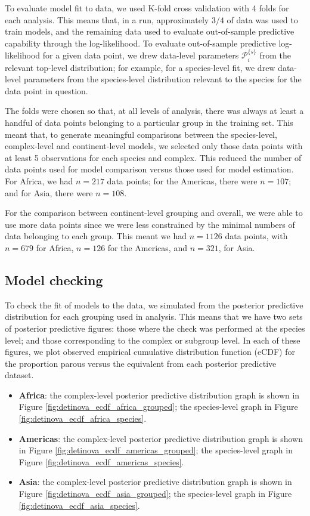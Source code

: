 \documentclass[12pt]{article}
\begin{document}
{To evaluate model fit to data, we used K-fold cross validation with 4 folds for each analysis. This means that, in a run, approximately $3/4$ of data was used to train models, and the remaining data used to evaluate out-of-sample predictive capability through the log-likelihood. To evaluate out-of-sample predictive log-likelihood for a given data point, we drew data-level parameters $\mathcal{P}_i^{\{s\}}$ from the relevant top-level distribution; for example, for a species-level fit, we drew data-level parameters from the species-level distribution relevant to the species for the data point in question. 

The folds were chosen so that, at all levels of analysis, there was always at least a handful of data points belonging to a particular group in the training set. This meant that, to generate meaningful comparisons between the species-level, complex-level and continent-level models, we selected only those data points with at least 5 observations for each species and complex. This reduced the number of data points used for model comparison versus those used for model estimation. For Africa, we had $n=217$ data points; for the Americas, there were $n=107$; and for Asia, there were $n=108$.

For the comparison between continent-level grouping and overall, we were able to use more data points since we were less constrained by the minimal numbers of data belonging to each group. This meant we had $n=1126$ data points, with $n=679$ for Africa, $n=126$ for the Americas, and $n=321$, for Asia.

\subsection{Model checking}
To check the fit of models to the data, we simulated from the posterior predictive distribution for each grouping used in analysis. This means that we have two sets of posterior predictive figures: those where the check was performed at the species level; and those corresponding to the complex or subgroup level. In each of these figures, we plot observed empirical cumulative distribution function (eCDF) for the proportion parous versus the equivalent from each posterior predictive dataset.

\begin{itemize}
	\item \textbf{Africa}: the complex-level posterior predictive distribution graph is shown in Figure \ref{fig:detinova_ecdf_africa_grouped}; the species-level graph in Figure \ref{fig:detinova_ecdf_africa_species}.
	\item \textbf{Americas}: the complex-level posterior predictive distribution graph is shown in Figure \ref{fig:detinova_ecdf_americas_grouped}; the species-level graph in Figure \ref{fig:detinova_ecdf_americas_species}.
	\item \textbf{Asia}: the complex-level posterior predictive distribution graph is shown in Figure \ref{fig:detinova_ecdf_asia_grouped}; the species-level graph in Figure \ref{fig:detinova_ecdf_asia_species}.
\end{itemize}

}
\end{document}
